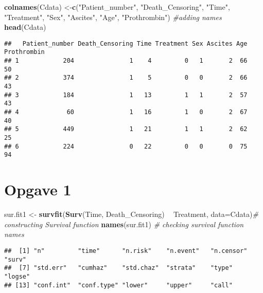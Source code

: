 \documentclass[
]{article}
\newenvironment{Shaded}{\begin{snugshade}}{\end{snugshade}}
\newcommand{\CommentTok}[1]{\textcolor[rgb]{0.56,0.35,0.01}{\textit{#1}}}
\newcommand{\DataTypeTok}[1]{\textcolor[rgb]{0.13,0.29,0.53}{#1}}
\newcommand{\KeywordTok}[1]{\textcolor[rgb]{0.13,0.29,0.53}{\textbf{#1}}}
\newcommand{\NormalTok}[1]{#1}
\newcommand{\OperatorTok}[1]{\textcolor[rgb]{0.81,0.36,0.00}{\textbf{#1}}}
\newcommand{\StringTok}[1]{\textcolor[rgb]{0.31,0.60,0.02}{#1}}
\begin{document}
\begin{Shaded}
\begin{Highlighting}[]
\KeywordTok{colnames}\NormalTok{(Cdata) <-}\KeywordTok{c}\NormalTok{(}\StringTok{"Patient_number"}\NormalTok{, }\StringTok{"Death_Censoring"}\NormalTok{, }\StringTok{"Time"}\NormalTok{, }\StringTok{"Treatment"}\NormalTok{, }\StringTok{"Sex"}\NormalTok{, }\StringTok{"Ascites"}\NormalTok{, }\StringTok{"Age"}\NormalTok{, }\StringTok{"Prothrombin"}\NormalTok{) }\CommentTok{#adding names}
\KeywordTok{head}\NormalTok{(Cdata)}
\end{Highlighting}
\end{Shaded}

\begin{verbatim}
##   Patient_number Death_Censoring Time Treatment Sex Ascites Age Prothrombin
## 1            204               1    4         0   1       2  66          50
## 2            374               1    5         0   0       2  66          43
## 3            184               1   13         1   1       2  57          43
## 4             60               1   16         1   0       2  67          40
## 5            449               1   21         1   1       2  62          25
## 6            224               0   22         0   0       0  75          94
\end{verbatim}

\hypertarget{opgave-1}{%
\section{Opgave 1}\label{opgave-1}}

\begin{Shaded}
\begin{Highlighting}[]
\NormalTok{sur.fit1 <-}\StringTok{ }\KeywordTok{survfit}\NormalTok{(}\KeywordTok{Surv}\NormalTok{(Time, Death_Censoring) }\OperatorTok{~}\StringTok{ }\NormalTok{Treatment, }\DataTypeTok{data=}\NormalTok{Cdata)}\CommentTok{# constructing Survival function}
\KeywordTok{names}\NormalTok{(sur.fit1) }\CommentTok{# checking survival function names}
\end{Highlighting}
\end{Shaded}

\begin{verbatim}
##  [1] "n"         "time"      "n.risk"    "n.event"   "n.censor"  "surv"     
##  [7] "std.err"   "cumhaz"    "std.chaz"  "strata"    "type"      "logse"    
## [13] "conf.int"  "conf.type" "lower"     "upper"     "call"
\end{verbatim}
\end{document}
